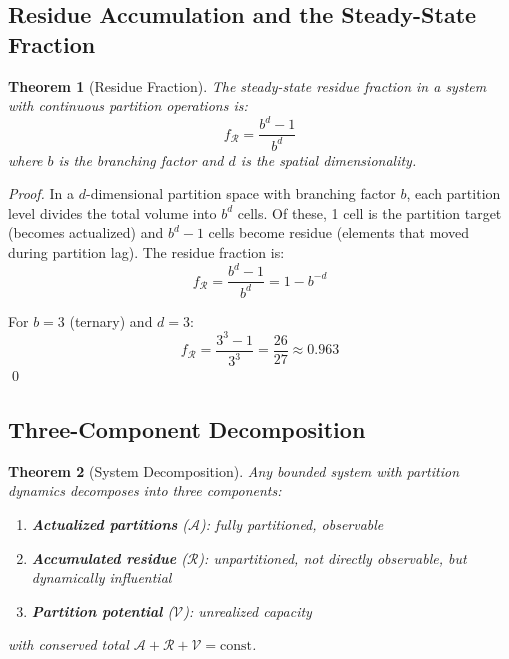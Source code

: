 \documentclass[twocolumn,10pt,a4paper]{article}
\newtheorem{theorem}{Theorem}[section]
\theoremstyle{definition}
\theoremstyle{remark}
\newcommand{\Potential}{\mathcal{V}}
\newcommand{\Residue}{\mathcal{R}}
\begin{document}
\subsection{Residue Accumulation and the Steady-State Fraction}

\begin{theorem}[Residue Fraction]
\label{thm:fraction}
The steady-state residue fraction in a system with continuous partition operations is:
\begin{equation}
    f_{\Residue} = \frac{b^d - 1}{b^d}
\end{equation}
where $b$ is the branching factor and $d$ is the spatial dimensionality.
\end{theorem}

\begin{proof}
In a $d$-dimensional partition space with branching factor $b$, each partition level divides the total volume into $b^d$ cells. Of these, 1 cell is the partition target (becomes actualized) and $b^d - 1$ cells become residue (elements that moved during partition lag). The residue fraction is:
\begin{equation}
    f_{\Residue} = \frac{b^d - 1}{b^d} = 1 - b^{-d}
\end{equation}

For $b = 3$ (ternary) and $d = 3$:
\begin{equation}
    f_{\Residue} = \frac{3^3 - 1}{3^3} = \frac{26}{27} \approx 0.963
\end{equation}
\qed
\end{proof}

\subsection{Three-Component Decomposition}

\begin{theorem}[System Decomposition]
\label{thm:decomposition}
Any bounded system with partition dynamics decomposes into three components:
\begin{enumerate}
    \item \textbf{Actualized partitions} ($\mathcal{A}$): fully partitioned, observable
    \item \textbf{Accumulated residue} ($\Residue$): unpartitioned, not directly observable, but dynamically influential
    \item \textbf{Partition potential} ($\Potential$): unrealized capacity
\end{enumerate}
with conserved total $\mathcal{A} + \Residue + \Potential = \text{const}$.
\end{theorem}
\end{document}
